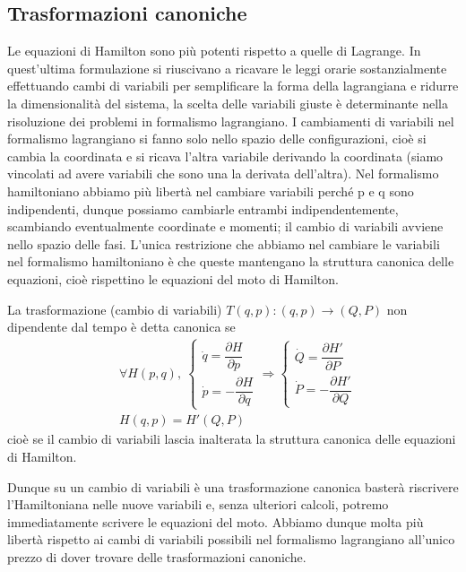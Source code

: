 \documentclass[
10pt, %
a4paper, %
oneside, %
headinclude,footinclude, %
BCOR5mm, %
]{scrartcl}
\begin{document}
\subsection{Trasformazioni canoniche}
Le equazioni di Hamilton sono più potenti rispetto a quelle di Lagrange. In quest'ultima formulazione si riuscivano a ricavare le leggi orarie sostanzialmente effettuando cambi di variabili per semplificare la forma della lagrangiana e ridurre la dimensionalità del sistema, la scelta delle variabili giuste è determinante nella risoluzione dei problemi in formalismo lagrangiano. I cambiamenti di variabili nel formalismo lagrangiano si fanno solo nello spazio delle configurazioni, cioè si cambia la coordinata e si ricava l'altra variabile derivando la coordinata (siamo vincolati ad avere variabili che sono una la derivata dell'altra). Nel formalismo hamiltoniano abbiamo più libertà nel cambiare variabili perché p e q sono indipendenti, dunque possiamo cambiarle entrambi indipendentemente, scambiando eventualmente coordinate e momenti; il cambio di variabili avviene nello spazio delle fasi. L'unica restrizione che abbiamo nel cambiare le variabili nel formalismo hamiltoniano è che queste mantengano la struttura canonica delle equazioni, cioè rispettino le equazioni del moto di Hamilton.
\begin{definizione}\label{def:trasfon-indipendente-tempo}
	La trasformazione (cambio di variabili) \(T(q, p): (q, p)\rightarrow (Q, P)\) non dipendente dal tempo è detta canonica se
	\begin{align*}
		&\forall H(p, q),\ 
		\begin{cases}
			\dot{q} = \dfrac{\partial H}{\partial p}\\
			\dot{p} = -\dfrac{\partial H}{\partial q}
		\end{cases}\Rightarrow 
		\begin{cases}
			\dot{Q} = \dfrac{\partial H'}{\partial P}\\
			\dot{P} = -\dfrac{\partial H'}{\partial Q}
		\end{cases}\\
		&H(q, p) = H'(Q, P)
	\end{align*}
	cioè se il cambio di variabili lascia inalterata la struttura canonica delle equazioni di Hamilton.
\end{definizione} 
Dunque su un cambio di variabili è una trasformazione canonica basterà riscrivere l'Hamiltoniana nelle nuove variabili e, senza ulteriori calcoli, potremo immediatamente scrivere le equazioni del moto. Abbiamo dunque molta più libertà rispetto ai cambi di variabili possibili nel formalismo lagrangiano all'unico prezzo di dover trovare delle trasformazioni canoniche.\\
\end{document}
